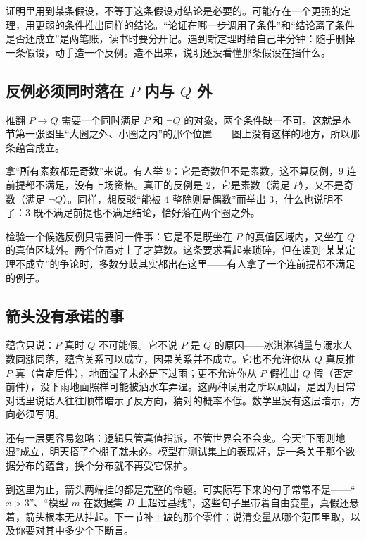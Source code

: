 \begin{remark}
证明里用到某条假设，不等于这条假设对结论是必要的。可能存在一个更强的定理，用更弱的条件推出同样的结论。``论证在哪一步调用了条件''和``结论离了条件是否还成立''是两笔账，读书时要分开记。遇到新定理时给自己半分钟：随手删掉一条假设，动手造一个反例。造不出来，说明还没看懂那条假设在挡什么。
\end{remark}

\subsection{反例必须同时落在 \texorpdfstring{\(P\) 内与 \(Q\) 外}{P 内与 Q 外}}

推翻 \(P\to Q\) 需要一个同时满足 \(P\) 和 \(\neg Q\) 的对象，两个条件缺一不可。这就是本节第一张图里``大圈之外、小圈之内''的那个位置——图上没有这样的地方，所以那条蕴含成立。

拿``所有素数都是奇数''来说。有人举 9：它是奇数但不是素数，这不算反例，9 连前提都不满足，没有上场资格。真正的反例是 2，它是素数（满足 \(P\)），又不是奇数（满足 \(\neg Q\)）。同样，想反驳``能被 4 整除则是偶数''而举出 3，什么也说明不了：3 既不满足前提也不满足结论，恰好落在两个圈之外。

检验一个候选反例只需要问一件事：它是不是既坐在 \(P\) 的真值区域内，又坐在 \(Q\) 的真值区域外。两个位置对上了才算数。这条要求看起来琐碎，但在读到``某某定理不成立''的争论时，多数分歧其实都出在这里——有人拿了一个连前提都不满足的例子。

\subsection{箭头没有承诺的事}

蕴含只说：\(P\) 真时 \(Q\) 不可能假。它不说 \(P\) 是 \(Q\) 的原因——冰淇淋销量与溺水人数同涨同落，蕴含关系可以成立，因果关系并不成立。它也不允许你从 \(Q\) 真反推 \(P\) 真（肯定后件），地面湿了未必是下过雨；更不允许你从 \(P\) 假推出 \(Q\) 假（否定前件），没下雨地面照样可能被洒水车弄湿。这两种误用之所以顽固，是因为日常对话里说话人往往顺带暗示了反方向，猜对的概率不低。数学里没有这层暗示，方向必须写明。

还有一层更容易忽略：逻辑只管真值指派，不管世界会不会变。今天``下雨则地湿''成立，明天搭了个棚子就未必。模型在测试集上的表现好，是一条关于那个数据分布的蕴含，换个分布就不再受它保护。

到这里为止，箭头两端挂的都是完整的命题。可实际写下来的句子常常不是——``\(x>3\)''、``模型 \(m\) 在数据集 \(D\) 上超过基线''，这些句子里带着自由变量，真假还悬着，箭头根本无从挂起。下一节补上缺的那个零件：说清变量从哪个范围里取，以及你要对其中多少个下断言。
